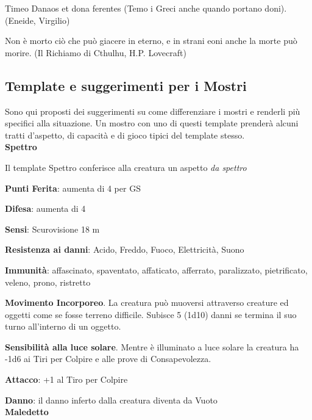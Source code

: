 \begin{enfasi}

Timeo Danaos et dona ferentes (Temo i Greci anche quando portano doni). (Eneide, Virgilio)

\medskip

Non è morto ciò che può giacere in eterno, e in strani eoni anche la morte può morire. (Il Richiamo di Cthulhu, H.P. Lovecraft)

\end{enfasi}

\pagebreak

\subsection{Template e suggerimenti per i Mostri}

\begin{multicols}{2}

Sono qui proposti dei suggerimenti su come differenziare i mostri e renderli più specifici alla situazione. Un mostro con uno di questi template prenderà alcuni tratti d'aspetto, di capacità e di gioco tipici del template stesso. \\

\textbf{Spettro}

Il template Spettro conferisce alla creatura un aspetto \emph{da spettro}

\textbf{Punti Ferita}: aumenta di 4 per GS

\textbf{Difesa}: aumenta di 4

\textbf{Sensi}: Scurovisione 18 m

\textbf{Resistenza ai danni}: Acido, Freddo, Fuoco, Elettricità, Suono

\textbf{Immunità}: affascinato, spaventato, affaticato, afferrato, paralizzato, pietrificato, veleno, prono, ristretto

\textbf{Movimento Incorporeo}. La creatura può muoversi attraverso creature ed oggetti come se fosse terreno difficile. Subisce 5 (1d10) danni se termina il suo turno
all’interno di un oggetto.

\textbf{Sensibilità alla luce solare}. Mentre è illuminato a luce solare la creatura ha -1d6 ai Tiri per Colpire e alle prove di Consapevolezza.

\textbf{Attacco}: +1 al Tiro per Colpire

\textbf{Danno}: il danno inferto dalla creatura diventa da Vuoto\\

\textbf{Maledetto}


\end{multicols}
